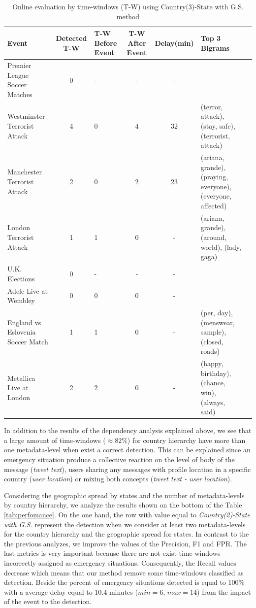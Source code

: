 \documentclass[sigconf]{acmart}
\begin{document}
\begin{table}
	\caption{Online evaluation by time-windows (T-W) using Country(3)-State with G.S. method}
	\label{tab:online2}
	\begin{tabular}{lclccp{3.5cm}l}
		\toprule
		Event &Detected T-W & T-W Before Event & T-W After Event & Delay(min) & Top 3 Bigrams\\
		\midrule
		Premier League Soccer Matches & 0& - & - & - & \hfill \break \\
		Westminster Terrorist Attack& 4 & 0 &4 & 32& \small{(terror, attack), (stay, safe), (terrorist, attack)}\\
		Manchester Terrorist Attack& 2& 0& 2& 23& \small{(ariana, grande), (praying, everyone), (everyone, affected)}\\
		London Terrorist Attack & 1 & 1 & 0 & - & \small{(ariana, grande), (around, world), (lady, gaga)} \\
		U.K. Elections& 0 & - & - & - & \hfill \break\\
		Adele Live at Wembley& 0& 0&0&-& \hfill \break\\
		England vs Eslovenia Soccer Match & 1& 1 & 0 & - & \small{(per, day), (menswear, sample), (closed, roads)}\\
		Metallica Live at London& 2 & 2 & 0 & - & \small{(happy, birthday), (chance, win), (always, said)}\\
		\bottomrule
	\end{tabular}
\end{table}
In addition to the results of the dependency analysis explained above, we see that a large amount of time-windows ($\approx 82\%$) for country hierarchy have more than one metadata-level when exist a correct detection. This can be explained since an emergency situation produce a collective reaction on the level of body of the message (\textit{tweet text}), users sharing any messages with profile location in a specific country (\textit{user location}) or mixing both concepts (\textit{tweet text - user location}).


Considering the geographic spread by states and the number of metadata-levels by country hierarchy, we analyze the results shown on the bottom of the Table \ref{tab:perfomance}. On the one hand, the row with value equal to \textit{Country(2)-State with G.S.} represent the detection when we consider at least two metadata-levels for the country hierarchy and the geographic spread for states. In contrast to the the previous analyzes, we improve the values of the Precision, F1 and FPR. The last metrics is very important because there are not exist time-windows incorrectly assigned as emergency situations. Consequently, the Recall values decrease which means that our method remove some time-windows classified as detection. Beside the percent of emergency situations detected is equal to $100\%$ with a average delay equal to $10.4$ minutes ($min=6$, $max=14$) from the impact of the event to the detection.
\end{document}
